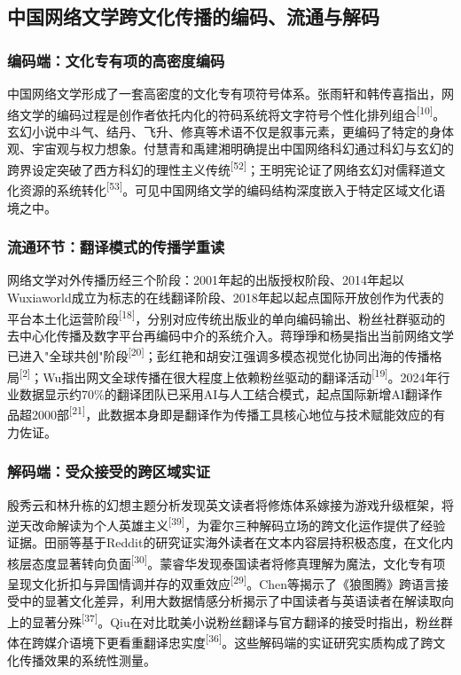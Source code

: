 \documentclass[12pt, a4paper]{article}
\newcommand{\citemark}[1]{\textsuperscript{[#1]}}
\begin{document}
\subsection{中国网络文学跨文化传播的编码、流通与解码}

\subsubsection{编码端：文化专有项的高密度编码}

中国网络文学形成了一套高密度的文化专有项符号体系。张雨轩和韩传喜指出，网络文学的编码过程是创作者依托内化的符码系统将文字符号个性化排列组合\citemark{10}。玄幻小说中斗气、结丹、飞升、修真等术语不仅是叙事元素，更编码了特定的身体观、宇宙观与权力想象。付慧青和禹建湘明确提出中国网络科幻通过科幻与玄幻的跨界设定突破了西方科幻的理性主义传统\citemark{52}；王明宪论证了网络玄幻对儒释道文化资源的系统转化\citemark{53}。可见中国网络文学的编码结构深度嵌入于特定区域文化语境之中。

\subsubsection{流通环节：翻译模式的传播学重读}

网络文学对外传播历经三个阶段：2001年起的出版授权阶段、2014年起以Wuxiaworld成立为标志的在线翻译阶段、2018年起以起点国际开放创作为代表的平台本土化运营阶段\citemark{18}，分别对应传统出版业的单向编码输出、粉丝社群驱动的去中心化传播及数字平台再编码中介的系统介入。蒋琤琤和杨昊指出当前网络文学已进入"全球共创"阶段\citemark{20}；彭红艳和胡安江强调多模态视觉化协同出海的传播格局\citemark{2}；Wu指出网文全球传播在很大程度上依赖粉丝驱动的翻译活动\citemark{19}。2024年行业数据显示约70\%的翻译团队已采用AI与人工结合模式，起点国际新增AI翻译作品超2000部\citemark{21}，此数据本身即是翻译作为传播工具核心地位与技术赋能效应的有力佐证。

\subsubsection{解码端：受众接受的跨区域实证}

殷秀云和林升栋的幻想主题分析发现英文读者将修炼体系嫁接为游戏升级框架，将逆天改命解读为个人英雄主义\citemark{39}，为霍尔三种解码立场的跨文化运作提供了经验证据。田丽等基于Reddit的研究证实海外读者在文本内容层持积极态度，在文化内核层态度显著转向负面\citemark{30}。蒙睿华发现泰国读者将修真理解为魔法，文化专有项呈现文化折扣与异国情调并存的双重效应\citemark{29}。Chen等揭示了《狼图腾》跨语言接受中的显著文化差异，利用大数据情感分析揭示了中国读者与英语读者在解读取向上的显著分殊\citemark{37}。Qiu在对比耽美小说粉丝翻译与官方翻译的接受时指出，粉丝群体在跨媒介语境下更看重翻译忠实度\citemark{36}。这些解码端的实证研究实质构成了跨文化传播效果的系统性测量。
\end{document}
